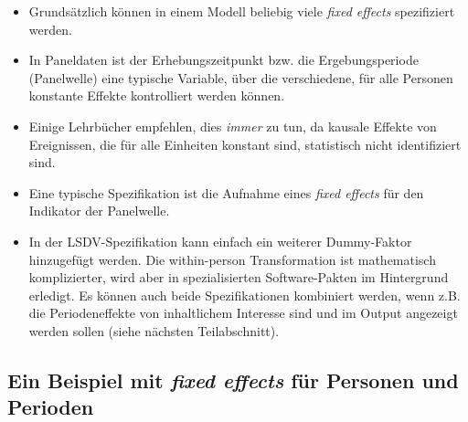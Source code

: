 \documentclass[]{book}
\newenvironment{Shaded}{\begin{snugshade}}{\end{snugshade}}
\newcommand{\DataTypeTok}[1]{\textcolor[rgb]{0.13,0.29,0.53}{#1}}
\newcommand{\DecValTok}[1]{\textcolor[rgb]{0.00,0.00,0.81}{#1}}
\newcommand{\KeywordTok}[1]{\textcolor[rgb]{0.13,0.29,0.53}{\textbf{#1}}}
\newcommand{\NormalTok}[1]{#1}
\newcommand{\OperatorTok}[1]{\textcolor[rgb]{0.81,0.36,0.00}{\textbf{#1}}}
\newcommand{\StringTok}[1]{\textcolor[rgb]{0.31,0.60,0.02}{#1}}
\providecommand{\tightlist}{%
  \setlength{\itemsep}{0pt}\setlength{\parskip}{0pt}}
\begin{document}
\begin{itemize}
\tightlist
\item
  Grundsätzlich können in einem Modell beliebig viele \emph{fixed effects} spezifiziert werden.
\item
  In Paneldaten ist der Erhebungszeitpunkt bzw. die Ergebungsperiode (Panelwelle) eine typische Variable, über die verschiedene, für alle Personen konstante Effekte kontrolliert werden können.
\item
  Einige Lehrbücher empfehlen, dies \emph{immer} zu tun, da kausale Effekte von Ereignissen, die für alle Einheiten konstant sind, statistisch nicht identifiziert sind.
\item
  Eine typische Spezifikation ist die Aufnahme eines \emph{fixed effects} für den Indikator der Panelwelle.
\item
  In der LSDV-Spezifikation kann einfach ein weiterer Dummy-Faktor hinzugefügt werden. Die within-person Transformation ist mathematisch komplizierter, wird aber in spezialisierten Software-Pakten im Hintergrund erledigt. Es können auch beide Spezifikationen kombiniert werden, wenn z.B. die Periodeneffekte von inhaltlichem Interesse sind und im Output angezeigt werden sollen (siehe nächsten Teilabschnitt).
\end{itemize}

\hypertarget{ein-beispiel-mit-fixed-effects-fuxfcr-personen-und-perioden}{%
\subsection*{\texorpdfstring{Ein Beispiel mit \emph{fixed effects} für Personen und Perioden}{Ein Beispiel mit fixed effects für Personen und Perioden}}\label{ein-beispiel-mit-fixed-effects-fuxfcr-personen-und-perioden}}

\begin{Shaded}
\end{Shaded}
\end{document}
